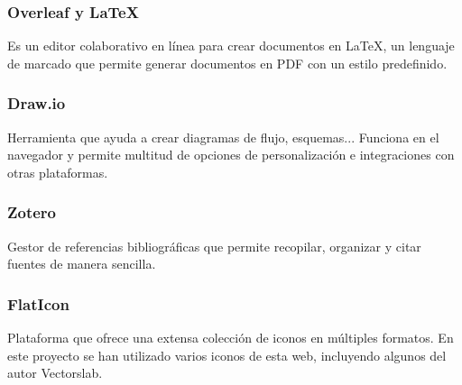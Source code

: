 \subsubsection{Overleaf y LaTeX}
\label{subsubsec:Overleaf}
Es un editor colaborativo en línea para crear documentos en LaTeX, un lenguaje de marcado que permite generar documentos en PDF con un estilo predefinido.

\subsubsection{Draw.io}
\label{subsubsec:Draw}
Herramienta que ayuda a crear diagramas de flujo, esquemas... Funciona en el navegador y permite multitud de opciones de personalización e integraciones con otras plataformas.

\subsubsection{Zotero}
\label{subsubsec:Zotero}
Gestor de referencias bibliográficas que permite recopilar, organizar y citar fuentes de manera sencilla.

\subsubsection{FlatIcon}
\label{subsubsec:FlatIcon}
Plataforma que ofrece una extensa colección de iconos en múltiples formatos. En este proyecto se han utilizado varios iconos de esta web, incluyendo algunos del autor Vectorslab.
 